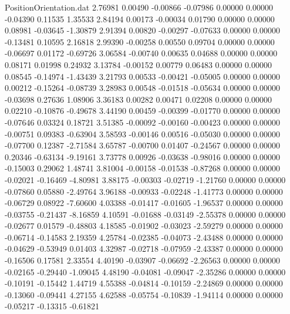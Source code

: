 \begin{filecontents}{PositionOrientation.dat}
   2.76981    0.00490   -0.00866    -0.07986    0.00000    0.00000   -0.04390    0.11535    1.35533
   2.84194    0.00173   -0.00034     0.01790    0.00000    0.00000    0.08981   -0.03645   -1.30879
   2.91394    0.00820   -0.00297    -0.07633    0.00000    0.00000   -0.13481    0.10595    2.16818
   2.99390   -0.00258    0.00550     0.09704    0.00000    0.00000   -0.06697    0.01172   -0.69726
   3.06584   -0.00740    0.00635     0.04688    0.00000    0.00000    0.08171    0.01998    0.24932
   3.13784   -0.00152    0.00779     0.06483    0.00000    0.00000    0.08545   -0.14974   -1.43439
   3.21793    0.00533   -0.00421    -0.05005    0.00000    0.00000    0.00212   -0.15264   -0.08739
   3.28983    0.00548   -0.01518    -0.05634    0.00000    0.00000   -0.03698    0.27636    1.08906
   3.36183    0.00282    0.00471     0.02208    0.00000    0.00000    0.02210   -0.10876   -0.49678
   3.44190    0.00459   -0.00399    -0.01770    0.00000    0.00000   -0.07646    0.03324    0.18721
   3.51385   -0.00092   -0.00160    -0.00423    0.00000    0.00000   -0.00751    0.09383   -0.63904
   3.58593   -0.00146    0.00516    -0.05030    0.00000    0.00000   -0.07700    0.12387   -2.71584
   3.65787   -0.00700    0.01407    -0.24567    0.00000    0.00000    0.20346   -0.63134   -9.19161
   3.73778    0.00926   -0.03638    -0.98016    0.00000    0.00000   -0.15003    0.29062    1.48741
   3.81004   -0.00158   -0.01538    -0.87268    0.00000    0.00000   -0.02021   -0.16469   -4.80981
   3.88175   -0.00303   -0.02719    -1.21760    0.00000    0.00000   -0.07860    0.05880   -2.49764
   3.96188   -0.00933   -0.02248    -1.41773    0.00000    0.00000   -0.06729    0.08922   -7.60600
   4.03388   -0.01417   -0.01605    -1.96537    0.00000    0.00000   -0.03755   -0.21437   -8.16859
   4.10591   -0.01688   -0.03149    -2.55378    0.00000    0.00000   -0.02677    0.01579   -0.48803
   4.18585   -0.01902   -0.03023    -2.59279    0.00000    0.00000   -0.06714   -0.14583    2.19359
   4.25784   -0.02385   -0.04073    -2.43488    0.00000    0.00000   -0.04629   -0.53949    0.01403
   4.32987   -0.02718   -0.07959    -2.43387    0.00000    0.00000   -0.16506    0.17581    2.33554
   4.40190   -0.03907   -0.06692    -2.26563    0.00000    0.00000   -0.02165   -0.29440   -1.09045
   4.48190   -0.04081   -0.09047    -2.35286    0.00000    0.00000   -0.10191   -0.15442    1.44719
   4.55388   -0.04814   -0.10159    -2.24869    0.00000    0.00000   -0.13060   -0.09441    4.27155
   4.62588   -0.05754   -0.10839    -1.94114    0.00000    0.00000   -0.05217   -0.13315   -0.61821

\end{filecontents}
